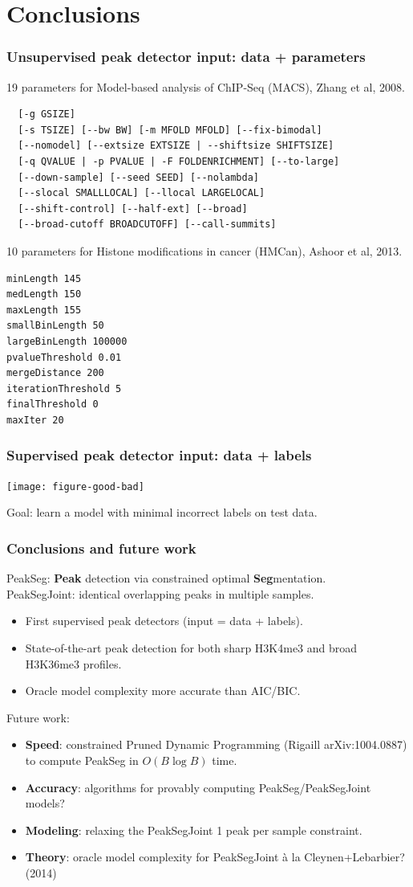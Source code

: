 \documentclass{beamer}
\begin{document}
\section{Conclusions}

\begin{frame}[fragile]
  \frametitle{Unsupervised peak detector input: data + parameters}
\scriptsize
19 parameters for Model-based analysis of ChIP-Seq (MACS), Zhang et al, 2008.
\begin{verbatim}
  [-g GSIZE]
  [-s TSIZE] [--bw BW] [-m MFOLD MFOLD] [--fix-bimodal]
  [--nomodel] [--extsize EXTSIZE | --shiftsize SHIFTSIZE]
  [-q QVALUE | -p PVALUE | -F FOLDENRICHMENT] [--to-large]
  [--down-sample] [--seed SEED] [--nolambda]
  [--slocal SMALLLOCAL] [--llocal LARGELOCAL]
  [--shift-control] [--half-ext] [--broad]
  [--broad-cutoff BROADCUTOFF] [--call-summits]
\end{verbatim}
10 parameters for Histone modifications in cancer (HMCan),
Ashoor et al, 2013.
\begin{verbatim}
minLength 145
medLength 150
maxLength 155
smallBinLength 50
largeBinLength 100000
pvalueThreshold 0.01
mergeDistance 200
iterationThreshold 5
finalThreshold 0
maxIter 20
\end{verbatim}
\end{frame}

\begin{frame}
  \frametitle{Supervised peak detector input: data + labels}

  \texttt{[image: figure-good-bad]}

  Goal: learn a model with minimal incorrect labels on test data.

\end{frame}

\begin{frame}
  \frametitle{Conclusions and future work}
  PeakSeg: \textbf{Peak} detection via constrained optimal
  \textbf{Seg}mentation.\\
  PeakSegJoint: identical overlapping peaks in multiple samples.
  \begin{itemize}
  \item First supervised peak detectors (input = data + labels).
  \item State-of-the-art peak detection for both sharp H3K4me3 and
    broad H3K36me3 profiles.
  \item Oracle model complexity more accurate than AIC/BIC.
  \end{itemize}
  Future work:
  \begin{itemize}
  \item \textbf{Speed}: constrained Pruned Dynamic Programming (Rigaill
    arXiv:1004.0887) to compute PeakSeg in $O(B\log B)$ time.
  \item \textbf{Accuracy}: algorithms for provably computing
    PeakSeg/PeakSegJoint models?
  \item \textbf{Modeling}: relaxing the PeakSegJoint 1 peak per sample
    constraint.
  \item \textbf{Theory}: oracle model complexity for PeakSegJoint \`a
    la Cleynen+Lebarbier?  (2014)
  \end{itemize}
\end{frame}
\end{document}
